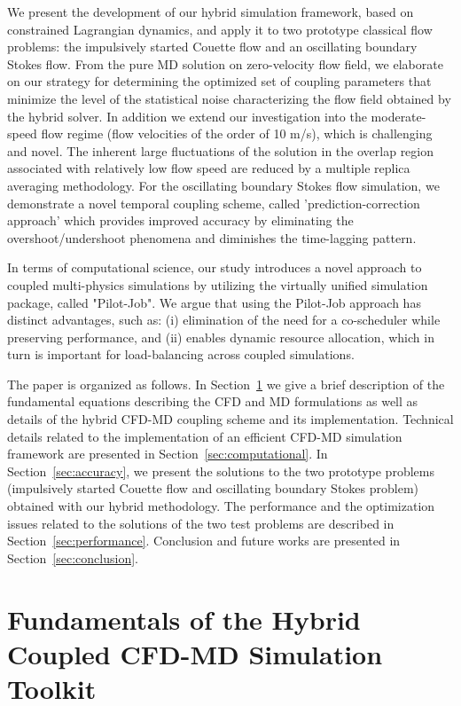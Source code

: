 \documentclass[preprint,12pt]{elsarticle}
\begin{document}
We present the development of our hybrid simulation framework, based on constrained Lagrangian dynamics, and apply it to two prototype classical flow problems: the impulsively started Couette flow and an oscillating boundary Stokes flow.
From the pure MD solution on zero-velocity flow field, we elaborate on our strategy for determining the optimized set of coupling parameters that minimize the level of the statistical noise characterizing the flow field obtained by the hybrid solver. 
In addition we extend our investigation into the moderate-speed flow regime (flow velocities of the order of 10 m/s), which is challenging and novel. The inherent large fluctuations of the solution in the overlap region associated with relatively low flow speed are reduced by a multiple replica averaging methodology. For the oscillating boundary Stokes flow simulation, we demonstrate a novel temporal coupling scheme, called 'prediction-correction approach' which provides improved accuracy by eliminating the overshoot/undershoot phenomena and diminishes the time-lagging pattern.

In terms of computational science, our study introduces a novel approach to coupled multi-physics simulations by utilizing the virtually unified simulation package, called "Pilot-Job". We argue that using the Pilot-Job approach has distinct advantages, such as: (i) elimination of the need for a co-scheduler while preserving performance, and (ii) enables dynamic resource allocation, which in turn is important for load-balancing across coupled simulations. 

The paper is organized as follows. In Section~\ref{sec:numerical} we give a brief description of the fundamental equations describing the CFD and MD formulations as well as details of the hybrid CFD-MD coupling scheme and its implementation. Technical details related to the implementation of an efficient CFD-MD simulation framework are presented in Section~\ref{sec:computational}. In Section~\ref{sec:accuracy}, we present the solutions to the two prototype problems (impulsively started Couette flow and oscillating boundary Stokes problem) obtained with our hybrid methodology. The performance and the optimization issues related to the solutions of the two test problems are described in Section~\ref{sec:performance}. Conclusion and future works are presented in Section~\ref{sec:conclusion}.



\section{Fundamentals of the Hybrid Coupled CFD-MD Simulation Toolkit}
\label{sec:numerical}
\end{document}
